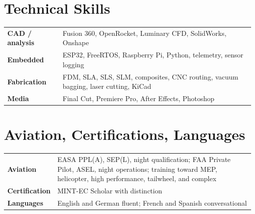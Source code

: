 \documentclass[10pt,letterpaper]{article}
\begin{document}
\section{Technical Skills}
\begin{tabularx}{\textwidth}{>{\bfseries}p{1.35in}X}
CAD / analysis & Fusion 360, OpenRocket, Luminary CFD, SolidWorks, Onshape\\
Embedded & ESP32, FreeRTOS, Raspberry Pi, Python, telemetry, sensor logging\\
Fabrication & FDM, SLA, SLS, SLM, composites, CNC routing, vacuum bagging, laser cutting, KiCad\\
Media & Final Cut, Premiere Pro, After Effects, Photoshop\\
\end{tabularx}

\section{Aviation, Certifications, Languages}
\begin{tabularx}{\textwidth}{>{\bfseries}p{1.35in}X}
Aviation & EASA PPL(A), SEP(L), night qualification; FAA Private Pilot, ASEL, night operations; training toward MEP, helicopter, high performance, tailwheel, and complex\\
Certification & MINT-EC Scholar with distinction\\
Languages & English and German fluent; French and Spanish conversational\\
\end{tabularx}
\end{document}
